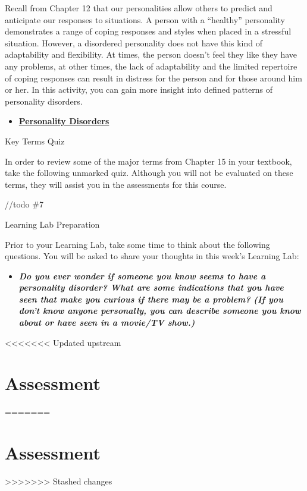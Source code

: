 \documentclass[
]{book}
\providecommand{\tightlist}{%
  \setlength{\itemsep}{0pt}\setlength{\parskip}{0pt}}
\begin{document}
\begin{reflect}
Recall from Chapter 12 that our personalities allow others to predict and anticipate our responses to situations. A person with a ``healthy'' personality demonstrates a range of coping responses and styles when placed in a stressful situation. However, a disordered personality does not have this kind of adaptability and flexibility. At times, the person doesn't feel they like they have any problems, at other times, the lack of adaptability and the limited repertoire of coping responses can result in distress for the person and for those around him or her. In this activity, you can gain more insight into defined patterns of personality disorders.

\begin{itemize}
\tightlist
\item
  \href{https://www.camh.ca/en/health-info/mental-illness-and-addiction-index/personality-disorders}{\textbf{Personality Disorders}}
\end{itemize}

{Key Terms Quiz}

In order to review some of the major terms from Chapter 15 in your textbook, take the following unmarked quiz. Although you will not be evaluated on these terms, they will assist you in the assessments for this course.

//todo \#7

{Learning Lab Preparation}

Prior to your Learning Lab, take some time to think about the following questions. You will be asked to share your thoughts in this week's Learning Lab:

\begin{itemize}
\tightlist
\item
  \textbf{\emph{Do you ever wonder if someone you know seems to have a personality disorder? What are some indications that you have seen that make you curious if there may be a problem? (If you don't know anyone personally, you can describe someone you know about or have seen in a movie/TV show.)}}
\end{itemize}
\end{reflect}

<<<<<<< Updated upstream
\hypertarget{assessment-9}{%
\section*{Assessment}\label{assessment-9}}
=======
\hypertarget{assessment-8}{%
\section*{Assessment}\label{assessment-8}}
>>>>>>> Stashed changes
\end{document}
